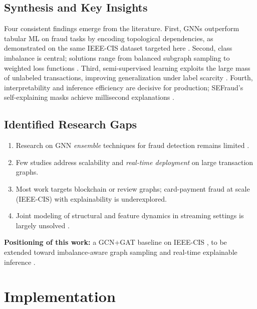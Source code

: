 \documentclass[conference]{IEEEtran}
\begin{document}
\subsection{Synthesis and Key Insights}
Four consistent findings emerge from the literature. First, GNNs
outperform tabular ML on fraud tasks by encoding topological dependencies,
as demonstrated on the same IEEE-CIS dataset targeted here
\cite{lu2025gnn,hiremath2024ensemble}. Second, class imbalance is central;
solutions range from balanced subgraph sampling
\cite{qian2025metapath} to weighted loss functions \cite{lu2025gnn}.
Third, semi-supervised learning exploits the large mass of unlabeled
transactions, improving generalization under label scarcity
\cite{qian2025metapath,wang2026cosemignn}. Fourth, interpretability and
inference efficiency are decisive for production; SEFraud's self-explaining
masks achieve millisecond explanations \cite{li2024sefraud}.

\subsection{Identified Research Gaps}
\begin{enumerate}
  \item Research on GNN \textit{ensemble} techniques for fraud detection
        remains limited \cite{hiremath2024ensemble}.
  \item Few studies address scalability and \textit{real-time deployment}
        on large transaction graphs.
  \item Most work targets blockchain or review graphs; card-payment fraud
        at scale (IEEE-CIS) with explainability is underexplored.
  \item Joint modeling of structural and feature dynamics in streaming
        settings is largely unsolved \cite{wang2026cosemignn}.
\end{enumerate}

\noindent\textbf{Positioning of this work:} a GCN+GAT baseline on IEEE-CIS
\cite{lu2025gnn,hiremath2024ensemble}, to be extended toward
imbalance-aware graph sampling \cite{qian2025metapath} and real-time
explainable inference \cite{li2024sefraud}.

\section{Implementation}
\end{document}
